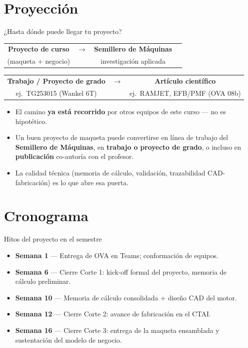 \documentclass[aspectratio=169]{beamer}
\begin{document}
\section{Proyección}
\begin{frame}{¿Hasta dónde puede llegar tu proyecto?}
  \centering
  \begin{tabular}{cccc}
    \textbf{Proyecto de curso} & $\rightarrow$ & \textbf{Semillero de Máquinas} & \\
    \small (maqueta + negocio) & & \small investigación aplicada &  \\[0.4cm]
  \end{tabular}

  \begin{tabular}{ccc}
    \textbf{Trabajo / Proyecto de grado} & $\rightarrow$ & \textbf{Artículo científico} \\
    \small ej.\ TG253015 (Wankel 6T) & & \small ej.\ RAMJET, EFB/PMF (OVA 08b) \\
  \end{tabular}
  \vspace{0.5cm}

  \raggedright
  \begin{itemize}
    \item El camino \textbf{ya está recorrido} por otros equipos de este curso — no es hipotético.
    \item Un buen proyecto de maqueta puede convertirse en línea de trabajo del \textbf{Semillero de
      Máquinas}, en \textbf{trabajo o proyecto de grado}, o incluso en \textbf{publicación} co-autoría con
      el profesor.
    \item La calidad técnica (memoria de cálculo, validación, trazabilidad CAD-fabricación) es lo que abre
      esa puerta.
  \end{itemize}
\end{frame}

\section{Cronograma}
\begin{frame}{Hitos del proyecto en el semestre}
  \begin{itemize}
    \item \textbf{Semana 1} — Entrega de OVA en Teams; conformación de equipos.
    \item \textbf{Semana 6} — Cierre Corte 1: kick-off formal del proyecto, memoria de cálculo preliminar.
    \item \textbf{Semana 10} — Memoria de cálculo consolidada + diseño CAD del motor.
    \item \textbf{Semana 12} — Cierre Corte 2: avance de fabricación en el CTAI.
    \item \textbf{Semana 16} — Cierre Corte 3: entrega de la maqueta ensamblada y sustentación del modelo
      de negocio.
  \end{itemize}
\end{frame}
\end{document}

